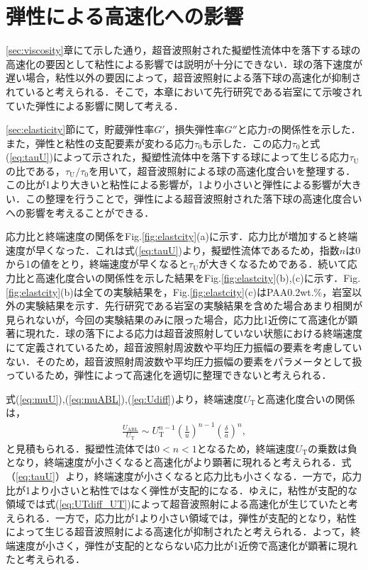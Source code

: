 \section{弾性による高速化への影響}
\label{sec:elasticity-discussion}

\ref{sec:viscosity}章にて示した通り，超音波照射された擬塑性流体中を落下する球の高速化の要因として粘性による影響では説明が十分にできない．球の落下速度が遅い場合，粘性以外の要因によって，超音波照射による落下球の高速化が抑制されていると考えられる．そこで，本章において先行研究である岩室\cite{ref:8}にて示唆されていた弾性による影響に関して考える．

\ref{sec:elasticity}節にて，貯蔵弾性率$G'$，損失弾性率$G''$と応力$\tau$の関係性を示した．また，弾性と粘性の支配要素が変わる応力$\tau_\text{0}$も示した．この応力$\tau_\text{0}$と式(\ref{eq:tauU})によって示された，擬塑性流体中を落下する球によって生じる応力$\tau_\text{U}$の比である，$\tau_\text{U}/\tau_\text{0}$を用いて，超音波照射による球の高速化度合いを整理する．この比が1より大きいと粘性による影響が，1より小さいと弾性による影響が大きい．この整理を行うことで，弾性による超音波照射された落下球の高速化度合いへの影響を考えることができる．

応力比と終端速度の関係をFig.\ref{fig:elastcity}(a)に示す．応力比が増加すると終端速度が早くなった．これは式(\ref{eq:tauU})より，擬塑性流体であるため，指数$n$は0から1の値をとり，終端速度が早くなると$\tau_\text{U}$が大きくなるためである．続いて応力比と高速化度合いの関係性を示した結果をFig.\ref{fig:elastcity}(b),(c)に示す．Fig.\ref{fig:elastcity}(b)は全ての実験結果を，Fig.\ref{fig:elastcity}(c)はPAA0.2wt.\%，岩室\cite{ref:8}以外の実験結果を示す．先行研究である岩室\cite{ref:8}の実験結果を含めた場合あまり相関が見られないが，今回の実験結果のみに限った場合，応力比1近傍にて高速化が顕著に現れた．球の落下による応力は超音波照射していない状態における終端速度にて定義されているため，超音波照射周波数や平均圧力振幅の要素を考慮していない．そのため，超音波照射周波数や平均圧力振幅の要素をパラメータとして扱っているため，弾性によって高速化を適切に整理できないと考えられる．

式(\ref{eq:muU}),(\ref{eq:muABL}),(\ref{eq:Udiff})より，終端速度$U_\text{T}$と高速化度合いの関係は，
\begin{eqnarray}
    \frac{U_\text{ABL}}{U_\text{T}} \sim U_\text{T}^{n-1} \left(\frac{1}{u}\right)^{n-1} \left(\frac{\delta}{a}\right)^n ,
    \label{eq:UTdiff_UT}
\end{eqnarray}
と見積もられる．擬塑性流体では$0<n<1$となるため，終端速度$U_\text{T}$の乗数は負となり，終端速度が小さくなると高速化がより顕著に現れると考えられる．式（\ref{eq:tauU}）より，終端速度が小さくなると応力比も小さくなる．一方で，応力比が1より小さいと粘性ではなく弾性が支配的になる．ゆえに，粘性が支配的な領域では式(\ref{eq:UTdiff_UT})によって超音波照射による高速化が生じていたと考えられる．一方で，応力比が1より小さい領域では，弾性が支配的となり，粘性によって生じる超音波照射による高速化が抑制されたと考えられる．よって，終端速度が小さく，弾性が支配的とならない応力比が1近傍で高速化が顕著に現れたと考えられる．

